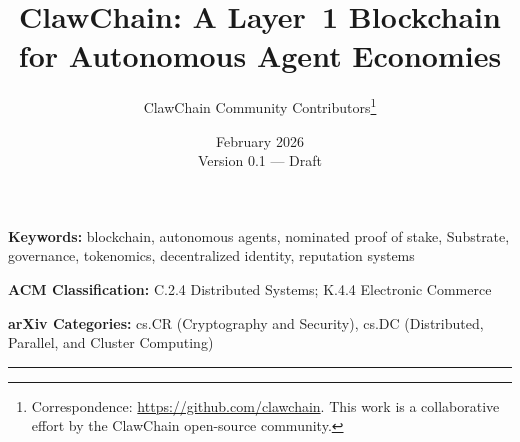 \documentclass[11pt,a4paper]{article}
\title{%
    \textbf{ClawChain: A Layer~1 Blockchain for Autonomous Agent Economies}
}
\author{
    ClawChain Community Contributors\thanks{%
        Correspondence: \url{https://github.com/clawchain}. 
        This work is a collaborative effort by the ClawChain open-source community.
    }
}
\date{February 2026 \\ \small Version 0.1 --- Draft}
\begin{document}
\maketitle



\vspace{0.5em}
\noindent\textbf{Keywords:} blockchain, autonomous agents, nominated proof of stake, Substrate, governance, tokenomics, decentralized identity, reputation systems

\vspace{0.3em}
\noindent\textbf{ACM Classification:} C.2.4 Distributed Systems; K.4.4 Electronic Commerce

\vspace{0.3em}
\noindent\textbf{arXiv Categories:} cs.CR (Cryptography and Security), cs.DC (Distributed, Parallel, and Cluster Computing)

\vspace{1em}
\hrule
\vspace{1em}












\end{document}
